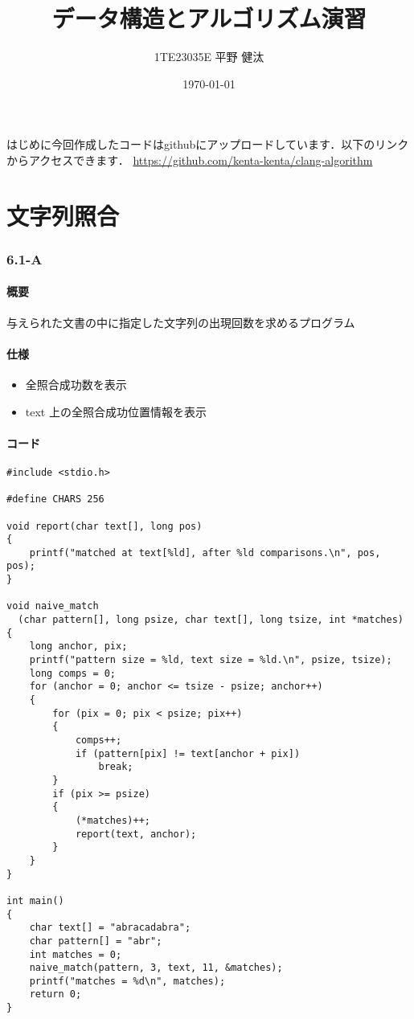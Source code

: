 \documentclass{ltjsarticle}
\begin{document}
\title{データ構造とアルゴリズム演習}
\author{1TE23035E 平野 健汰}
\date{\today}

\maketitle

はじめに今回作成したコードはgithubにアップロードしています．以下のリンクからアクセスできます．
\url{https://github.com/kenta-kenta/clang-algorithm}

\part{文字列照合}
\section{6.1-A}
\subsection{概要}
与えられた文書の中に指定した文字列の出現回数を求めるプログラム
\subsection{仕様}
\begin{itemize}
  \item 全照合成功数を表示
  \item text 上の全照合成功位置情報を表示
\end{itemize}

\subsection{コード}
\begin{lstlisting}[frame=single, lineskip=-5pt]
#include <stdio.h>

#define CHARS 256

void report(char text[], long pos)
{
    printf("matched at text[%ld], after %ld comparisons.\n", pos, pos);
}

void naive_match
  (char pattern[], long psize, char text[], long tsize, int *matches)
{
    long anchor, pix;
    printf("pattern size = %ld, text size = %ld.\n", psize, tsize);
    long comps = 0;
    for (anchor = 0; anchor <= tsize - psize; anchor++)
    {
        for (pix = 0; pix < psize; pix++)
        {
            comps++;
            if (pattern[pix] != text[anchor + pix])
                break;
        }
        if (pix >= psize)
        {
            (*matches)++;
            report(text, anchor);
        }
    }
}

int main()
{
    char text[] = "abracadabra";
    char pattern[] = "abr";
    int matches = 0;
    naive_match(pattern, 3, text, 11, &matches);
    printf("matches = %d\n", matches);
    return 0;
}
\end{lstlisting}
\end{document}
